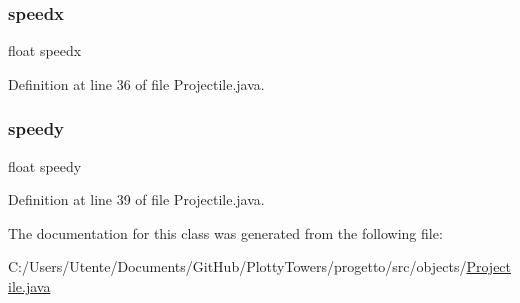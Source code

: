 \subsubsection{\texorpdfstring{speedx}{speedx}}
{\footnotesize\ttfamily float speedx\hspace{0.3cm}{\ttfamily [private]}}



Definition at line 36 of file Projectile.\+java.

\mbox{\label{classobjects_1_1_projectile_a13c57b666f056b5cae3bf6663337792c}} 
\subsubsection{\texorpdfstring{speedy}{speedy}}
{\footnotesize\ttfamily float speedy\hspace{0.3cm}{\ttfamily [private]}}



Definition at line 39 of file Projectile.\+java.



The documentation for this class was generated from the following file\+:\begin{DoxyCompactItemize}
\item 
C\+:/\+Users/\+Utente/\+Documents/\+Git\+Hub/\+Plotty\+Towers/progetto/src/objects/\hyperlink{_projectile_8java}{Projectile.\+java}\end{DoxyCompactItemize}
